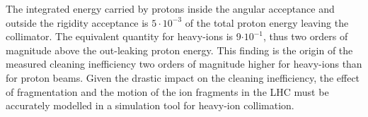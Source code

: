 The integrated energy carried by protons inside the angular acceptance and outside the rigidity acceptance is $5 \cdot 10^{-3}$ of the total proton energy leaving the collimator. The equivalent quantity for heavy-ions is 9$\cdot 10^{-1}$, thus two orders of magnitude above the out-leaking proton energy. This finding is the origin of the measured cleaning inefficiency two orders of magnitude higher for heavy-ions than for proton beams. Given the drastic impact on the cleaning inefficiency, the effect of fragmentation and the motion of the ion fragments in the LHC must be accurately modelled in a simulation tool for heavy-ion collimation.















